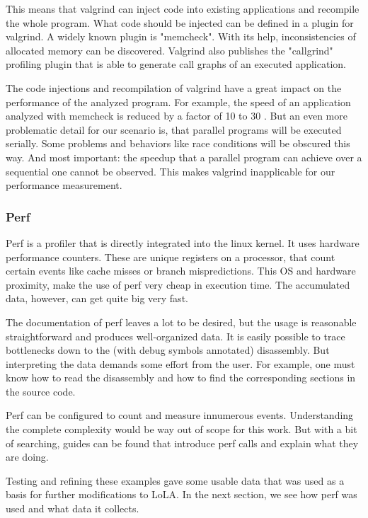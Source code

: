 This means that valgrind can inject code into existing applications and recompile the whole program. What code should be injected can be defined in a plugin for valgrind. A widely known plugin is "memcheck". With its help, inconsistencies of allocated memory can be discovered. Valgrind also publishes the "callgrind" profiling plugin that is able to generate call graphs of an executed application.

The code injections and recompilation of valgrind have a great impact on the performance of the analyzed program. For example, the speed of an application analyzed with memcheck is reduced by a factor of 10 to 30 \cite{valgrindTools}. But an even more problematic detail for our scenario is, that parallel programs will be executed serially. Some problems and behaviors like race conditions will be obscured this way. And most important: the speedup that a parallel program can achieve over a sequential one cannot be observed. This makes valgrind inapplicable for our performance measurement.

\subsubsection{Perf}
Perf is a profiler that is directly integrated into the linux kernel. It uses hardware performance counters. These are unique registers on a processor, that count certain events like cache misses or branch mispredictions. This OS and hardware proximity, make the use of perf very cheap in execution time. The accumulated data, however, can get quite big very fast.

The documentation of perf leaves a lot to be desired, but the usage is reasonable straightforward and produces well-organized data. It is easily possible to trace bottlenecks down to the (with debug symbols annotated) disassembly. But interpreting the data demands some effort from the user. For example, one must know how to read the disassembly and how to find the corresponding sections in the source code.

Perf can be configured to count and measure innumerous events. Understanding the complete complexity would be way out of scope for this work. But with a bit of searching, guides can be found that introduce perf calls and explain what they are doing\cite{perfExamples}.

Testing and refining these examples gave some usable data that was used as a basis for further modifications to LoLA. In the next section, we see how perf was used and what data it collects.

